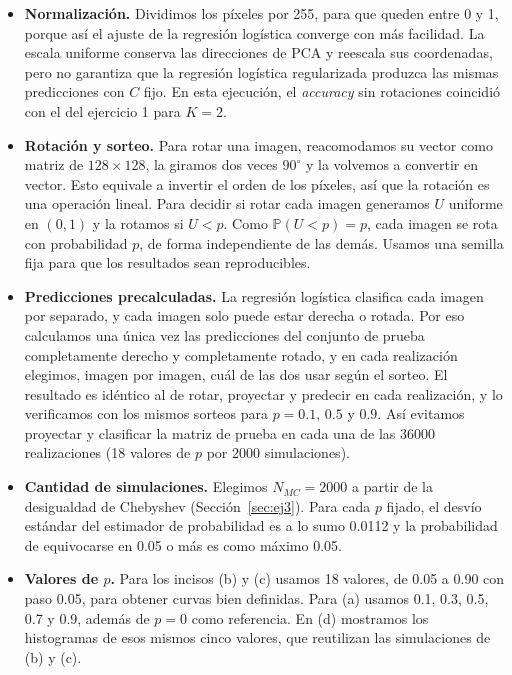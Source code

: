 \documentclass[11pt,a4paper]{article}
\newcommand{\Prob}{\mathbb{P}}
\newcommand{\acc}{\emph{accuracy}}
\begin{document}
\begin{itemize}
  \item \textbf{Normalización.} Dividimos los píxeles por 255, para que queden entre 0 y 1, porque así el
        ajuste de la regresión logística converge con más facilidad. La escala uniforme conserva las direcciones de PCA y reescala sus coordenadas, pero no garantiza
        que la regresión logística regularizada produzca las mismas predicciones con $C$ fijo. En esta
        ejecución, el \acc{} sin rotaciones coincidió con el del ejercicio 1 para $K=2$.
  \item \textbf{Rotación y sorteo.} Para rotar una imagen, reacomodamos su vector como matriz de
        $128\times128$, la giramos dos veces $90^\circ$ y la volvemos a convertir en vector. Esto equivale a
        invertir el orden de los píxeles, así que la rotación es una operación lineal. Para decidir si rotar
        cada imagen generamos $U$ uniforme en $(0,1)$ y la rotamos si $U<p$. Como $\Prob(U<p)=p$, cada
        imagen se rota con probabilidad $p$, de forma independiente de las demás. Usamos una semilla fija
        para que los resultados sean reproducibles.
  \item \textbf{Predicciones precalculadas.} La regresión logística clasifica cada imagen por separado, y
        cada imagen solo puede estar derecha o rotada. Por eso calculamos una única vez las predicciones del
        conjunto de prueba completamente derecho y completamente rotado, y en cada realización elegimos,
        imagen por imagen, cuál de las dos usar según el sorteo. El resultado es idéntico al de rotar,
        proyectar y predecir en cada realización, y lo verificamos con los mismos sorteos para $p = 0.1$,
        $0.5$ y $0.9$. Así evitamos proyectar y clasificar la matriz de prueba en cada una de las 36000
        realizaciones (18 valores de $p$ por 2000 simulaciones).
  \item \textbf{Cantidad de simulaciones.} Elegimos $N_{MC}=2000$ a partir de la desigualdad de Chebyshev
        (Sección~\ref{sec:ej3}). Para cada $p$ fijado, el desvío estándar del estimador de probabilidad es a lo
        sumo 0.0112 y la probabilidad de equivocarse en 0.05 o más es como máximo 0.05.
  \item \textbf{Valores de $p$.} Para los incisos (b) y (c) usamos 18 valores, de 0.05 a 0.90 con paso
        0.05, para obtener curvas bien definidas. Para (a) usamos 0.1, 0.3, 0.5, 0.7 y 0.9, además de $p=0$ como referencia.
        En (d) mostramos los histogramas de esos mismos cinco valores, que reutilizan las simulaciones
        de (b) y (c).
\end{itemize}
\end{document}
